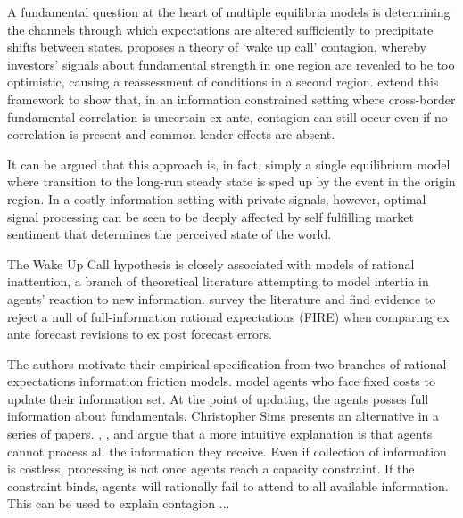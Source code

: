 \documentclass[../base.tex]{subfiles}
\begin{document}
A fundamental question at the heart of multiple equilibria models is determining the channels through which expectations are altered sufficiently to precipitate shifts between states. \cite{goldstein1998asian} proposes a theory of `wake up call' contagion, whereby investors' signals about fundamental strength in one region are revealed to be too optimistic, causing a reassessment of conditions in a second region. \cite{ahnert2015wake} extend this framework to show that, in an information constrained setting where cross-border fundamental correlation is uncertain ex ante, contagion can still occur even if no correlation is present and common lender effects are absent. 

It can be argued that this approach is, in fact, simply a single equilibrium model where transition to the long-run steady state is sped up by the event in the origin region. In a costly-information setting with private signals, however, optimal signal processing can be seen to be deeply affected by self fulfilling market sentiment that determines the perceived state of the world.

The Wake Up Call hypothesis is closely associated with models of rational inattention, a branch of theoretical literature attempting to model intertia in agents' reaction to new information.  \cite{coibion2010information} survey the literature and find evidence to reject a null of full-information rational expectations (FIRE) when comparing ex ante forecast revisions to ex post forecast errors. 

The authors motivate their empirical specification from two branches of rational expectations information friction models. \cite{NBERw8290} model agents who face fixed costs to update their information set. At the point of updating, the agents posses full information about fundamentals. Christopher Sims presents an alternative in a series of papers. \cite{sims1998stickiness}, \cite{sims2003implications}, and \cite{sims2006rational} argue that a more intuitive explanation is that agents cannot process all the information they receive. Even if collection of information is costless, processing is not once agents reach a capacity constraint. If the constraint binds, agents will rationally fail to attend to all available information. This can be used to explain contagion ...
\end{document}

